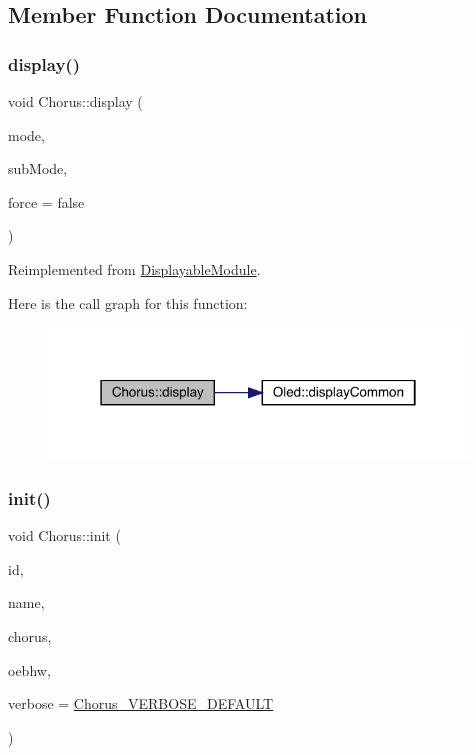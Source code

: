 \subsection{Member Function Documentation}
\mbox{\label{class_chorus_a6a28900025c58af59c7eb70f49347422}} 
\subsubsection{\texorpdfstring{display()}{display()}}
{\footnotesize\ttfamily void Chorus\+::display (\begin{DoxyParamCaption}\item[{int}]{mode,  }\item[{int}]{sub\+Mode,  }\item[{bool}]{force = {\ttfamily false} }\end{DoxyParamCaption})\hspace{0.3cm}{\ttfamily [virtual]}}



Reimplemented from \mbox{\hyperlink{class_displayable_module_a02de26d62ef508cae9ed07920e21784d}{Displayable\+Module}}.

Here is the call graph for this function\+:\nopagebreak
\begin{figure}[H]
\begin{center}
\leavevmode
\includegraphics[width=315pt]{class_chorus_a6a28900025c58af59c7eb70f49347422_cgraph}
\end{center}
\end{figure}
\mbox{\label{class_chorus_a234b46541693909b60a21cf644bd5926}} 
\subsubsection{\texorpdfstring{init()}{init()}}
{\footnotesize\ttfamily void Chorus\+::init (\begin{DoxyParamCaption}\item[{int}]{id,  }\item[{char $\ast$}]{name,  }\item[{Audio\+Effect\+Chorus $\ast$}]{chorus,  }\item[{\mbox{\hyperlink{class_open_effects_box_h_w}{Open\+Effects\+Box\+HW}} $\ast$}]{oebhw,  }\item[{int}]{verbose = {\ttfamily \mbox{\hyperlink{_chorus_8h_ab3779d2226e8ab06fa78da0c6161597a}{Chorus\+\_\+\+V\+E\+R\+B\+O\+S\+E\+\_\+\+D\+E\+F\+A\+U\+LT}}} }\end{DoxyParamCaption})}

